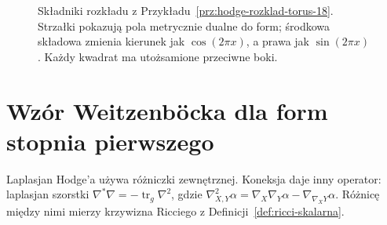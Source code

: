 \begin{figure}[H]
\centering
{}
\caption{Składniki rozkładu z Przykładu~\ref{prz:hodge-rozklad-torus-18}.
Strzałki pokazują pola metrycznie dualne do form;
środkowa składowa zmienia kierunek jak $\cos(2\pi x)$,
a prawa jak $\sin(2\pi x)$.
Każdy kwadrat ma utożsamione przeciwne boki.}
\label{fig:hodge-rozklad-torus}
\end{figure}

\section{Wzór Weitzenböcka dla form stopnia pierwszego}
\label{sec:bochner-weitzenbock}

Laplasjan Hodge'a używa różniczki zewnętrznej.
Koneksja daje inny operator: laplasjan szorstki
$\nabla^*\nabla=-\operatorname{tr}_g\nabla^2$, gdzie
$\nabla^2_{X,Y}\alpha
=\nabla_X\nabla_Y\alpha-\nabla_{\nabla_XY}\alpha$.
Różnicę między nimi mierzy krzywizna Ricciego
z Definicji~\ref{def:ricci-skalarna}.


